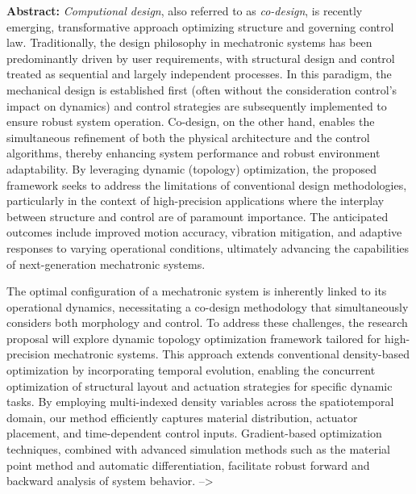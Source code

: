 \textbf{Abstract:} \emph{Computional design}, also referred to as
\emph{co-design}, is recently emerging, transformative approach
optimizing structure and governing control law. Traditionally, the
design philosophy in mechatronic systems has been predominantly driven
by user requirements, with structural design and control treated as
sequential and largely independent processes. In this paradigm, the
mechanical design is established first (often without the consideration
control's impact on dynamics) and control strategies are subsequently
implemented to ensure robust system operation. Co-design, on the other
hand, enables the simultaneous refinement of both the physical
architecture and the control algorithms, thereby enhancing system
performance and robust environment adaptability. By leveraging dynamic
(topology) optimization, the proposed framework seeks to address the
limitations of conventional design methodologies, particularly in the
context of high-precision applications where the interplay between
structure and control are of paramount importance. The anticipated
outcomes include improved motion accuracy, vibration mitigation, and
adaptive responses to varying operational conditions, ultimately
advancing the capabilities of next-generation mechatronic systems.

The optimal configuration of a mechatronic system is inherently linked
to its operational dynamics, necessitating a co-design methodology that
simultaneously considers both morphology and control. To address these
challenges, the research proposal will explore dynamic topology
optimization framework tailored for high-precision mechatronic systems.
This approach extends conventional density-based optimization by
incorporating temporal evolution, enabling the concurrent optimization
of structural layout and actuation strategies for specific dynamic
tasks. By employing multi-indexed density variables across the
spatiotemporal domain, our method efficiently captures material
distribution, actuator placement, and time-dependent control inputs.
Gradient-based optimization techniques, combined with advanced
simulation methods such as the material point method and automatic
differentiation, facilitate robust forward and backward analysis of
system behavior. --\textgreater{}

